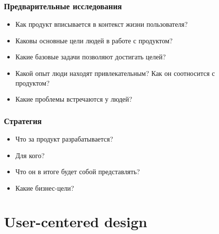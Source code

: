 \documentclass{../../slides-style}
\begin{document}
    \begin{frame}
        \frametitle{Предварительные исследования}
        \begin{itemize}
            \item Как продукт вписывается в контекст жизни пользователя? 
            \item Каковы основные цели людей в работе с продуктом? 
            \item Какие базовые задачи позволяют достигать целей? 
            \item Какой опыт люди находят привлекательным? Как он соотносится с продуктом?
            \item Какие проблемы встречаются у людей?
        \end{itemize}
    \end{frame}

    \begin{frame}
        \frametitle{Стратегия}
        \begin{itemize}
            \item Что за продукт разрабатывается?
            \item Для кого?
            \item Что он в итоге будет собой представлять?
            \item Какие бизнес-цели?
        \end{itemize}
    \end{frame}

    \section{User-centered design}
\end{document}
